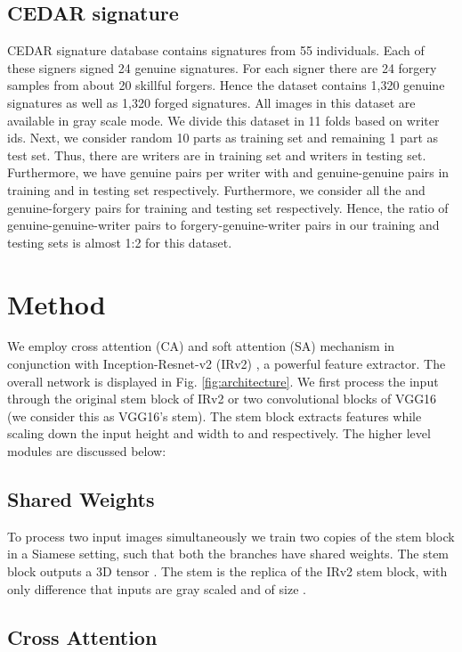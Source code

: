 \documentclass[a4paper,conference]{IEEEtran}
\begin{document}
\subsection{CEDAR signature}
CEDAR signature database \cite{signature_verif_dataset} contains signatures from 55 individuals. Each  of  these  signers  signed  24  genuine  signatures.  For each signer there are 24 forgery samples from about 20 skillful forgers.   Hence the  dataset contains 1,320 genuine signatures as well as 1,320 forged signatures. All images in this dataset are available in gray scale mode.
\newline \indent We divide this dataset in 11 folds based on writer ids. Next, we consider random 10 parts as training set and remaining 1 part as test set. Thus, there are  writers are in training set and  writers in testing set. Furthermore, we have  genuine pairs per writer with  and  genuine-genuine pairs in training and in testing set respectively. Furthermore, we consider all the  and  genuine-forgery pairs for training and testing set respectively. Hence, the ratio of genuine-genuine-writer pairs to forgery-genuine-writer pairs in our training and testing sets is almost 1:2 for this dataset.

\section{Method}
We employ cross attention (CA) and soft attention (SA) mechanism in conjunction with Inception-Resnet-v2 (IRv2) \cite{szegedy_inception-v4_2017}, a powerful feature extractor. The overall network is displayed in Fig.  \ref{fig:architecture}. We first process the input through the original stem block of IRv2 or two convolutional blocks of VGG16 (we consider this as VGG16's stem). The stem block extracts  features while scaling down the input height  and width  to  and  respectively. The higher level modules are discussed below:
\subsection{Shared Weights}
To process two input images simultaneously we train two copies of the stem block in a Siamese setting, such that both the branches have shared weights. The stem block outputs a 3D tensor . The stem is the replica of the IRv2 stem block, with only difference that inputs are gray scaled and of size .
\subsection{Cross Attention}
\end{document}
